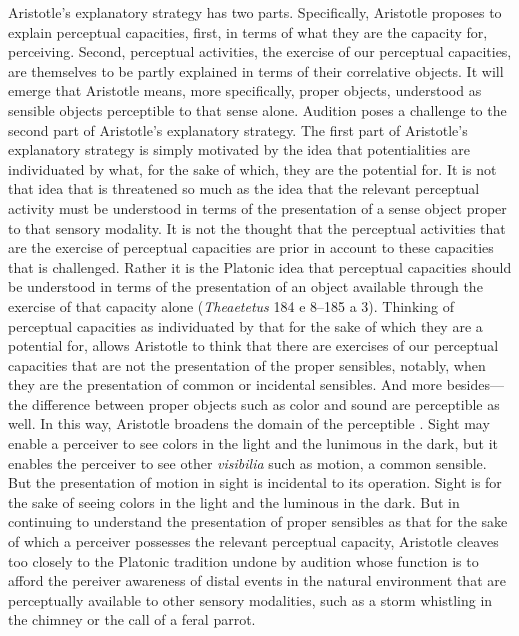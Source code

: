 Aristotle's explanatory strategy has two parts. Specifically, Aristotle proposes to explain perceptual capacities, first, in terms of what they are the capacity for, perceiving. Second, perceptual activities, the exercise of our perceptual capacities, are themselves to be partly explained in terms of their correlative objects. It will emerge that Aristotle means, more specifically, proper objects, understood as sensible objects perceptible to that sense alone. Audition poses a challenge to the second part of Aristotle's explanatory strategy. The first part of Aristotle's explanatory strategy is simply motivated by the idea that potentialities are individuated by what, for the sake of which, they are the potential for. It is not that idea that is threatened so much as the idea that the relevant perceptual activity must be understood in terms of the presentation of a sense object proper to that sensory modality. It is not the thought that the perceptual activities that are the exercise of perceptual capacities are prior in account to these capacities that is challenged. Rather it is the Platonic idea that perceptual capacities should be understood in terms of the presentation of an object available through the exercise of that capacity alone (\emph{Theaetetus} 184 e 8--185 a 3). Thinking of perceptual capacities as individuated by that for the sake of which they are a potential for, allows Aristotle to think that there are exercises of our perceptual capacities that are not the presentation of the proper sensibles, notably, when they are the presentation of common or incidental sensibles. And more besides---the difference between proper objects such as color and sound are perceptible as well. In this way, Aristotle broadens the domain of the perceptible \citep{Sorabji:1971fr,Sorabji:2003fk,Kalderon:2015fr}. Sight may enable a perceiver to see colors in the light and the lunimous in the dark, but it enables the perceiver to see other \emph{visibilia} such as motion, a common sensible. But the presentation of motion in sight is incidental to its operation. Sight is for the sake of seeing colors in the light and the luminous in the dark. But in continuing to understand the presentation of proper sensibles as that for the sake of which a perceiver possesses the relevant perceptual capacity, Aristotle cleaves too closely to the Platonic tradition undone by audition whose function is to afford the pereiver awareness of distal events in the natural environment that are perceptually available to other sensory modalities, such as a storm whistling in the chimney or the call of a feral parrot.


